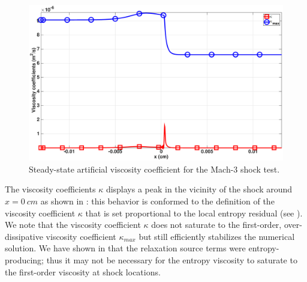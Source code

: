 \documentclass[times,doublespace]{fldauth}%
\begin{document}
%
\begin{figure}[H]
    \centering
    \includegraphics[width=\textwidth]{figures/cst-xs/mach_3_cst_xs_nel_1000_viscosity.eps}
    \caption{Steady-state artificial viscosity coefficient for the Mach-3 shock test.}\label{fig:mach-3-cst-xs-visc}
\end{figure}
%
The viscosity coefficients $\kappa$ displays a peak in the vicinity of the shock around $x=0 \ cm$ as shown in : this behavior is conformed to the definition of the viscosity coefficient $\kappa$ that is set proportional to the local entropy residual (see ). We note that the viscosity coefficient $\kappa$ does not saturate to the first-order, over-dissipative viscosity coefficient $\kappa_{max}$ but still efficiently stabilizes the numerical solution. We have shown
in  that the relaxation source terms were entropy-producing; thus it may not be necessary for the entropy viscosity to saturate to the first-order viscosity at shock locations.
%
\end{document}
